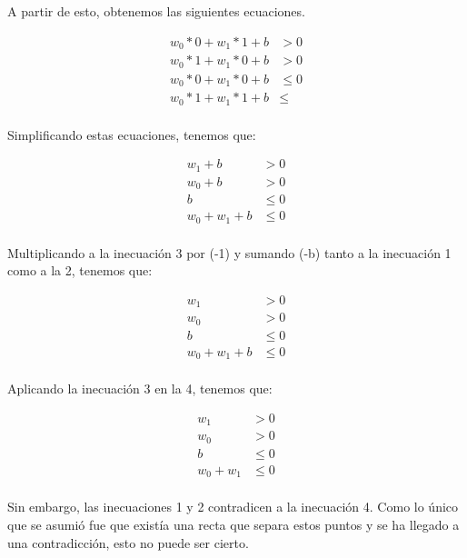 \documentclass[11pt,spanish,answers]{exam}
\begin{document}
\begin{questions}
\begin{solution}
    A partir de esto, obtenemos las siguientes ecuaciones.
    
    \begin{align*}
      w_0*0+ w_1*1 + b &> 0 \tag*{( (0,1) está en P )}\\
      w_0*1+ w_1*0 + b &> 0 \tag*{( (1,0) está en P )}\\
      w_0*0+ w_1*0 + b &\leq 0 \tag*{( (0,1) está en N )}\\
      w_0*1+ w_1*1 + b &\leq \tag*{( (1,0) está en N )}\\
    \end{align*}
    
    Simplificando estas ecuaciones, tenemos que:
    
    \begin{align*}
      w_1 + b &> 0 \tag*{( 1 )}\\
      w_0 + b &> 0 \tag*{( 2 )}\\
      b &\leq 0 \tag*{( 3 )}\\
      w_0 + w_1 + b &\leq 0 \tag*{( 4 )}\\
    \end{align*}
    
    Multiplicando a la inecuación 3 por (-1) y sumando (-b) tanto a la inecuación 1 como a la 2, tenemos que:
    
    \begin{align*}
      w_1 &> 0 \tag*{( 1 )}\\
      w_0 &> 0 \tag*{( 2 )}\\
      b &\leq 0 \tag*{( 3 )}\\
      w_0 + w_1 + b &\leq 0 \tag*{( 4 )}\\
    \end{align*}
    
    Aplicando la inecuación 3 en la 4, tenemos que:
    
    \begin{align*}
      w_1 &> 0 \tag*{( 1 )}\\
      w_0 &> 0 \tag*{( 2 )}\\
      b &\leq 0 \tag*{( 3 )}\\
      w_0 + w_1 &\leq 0 \tag*{( 4 )}\\
    \end{align*}
    
    Sin embargo, las inecuaciones 1 y 2 contradicen a la inecuación 4. Como lo único que se asumió fue que existía una recta que separa estos puntos y se ha llegado a una contradicción, esto no puede ser cierto.
    
    \end{solution}

\end{questions}
\end{document}
